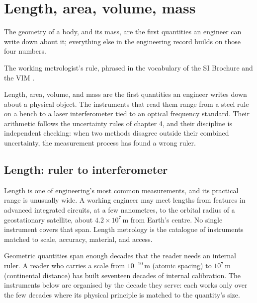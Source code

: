 \chapter{Length, area, volume, mass}
\label{vol01:ch07}

\epigraph{The geometry of a body, and its mass, are the first quantities
an engineer can write down about it; everything else in the engineering
record builds on those four numbers.}{The working metrologist's rule,
phrased in the vocabulary of the SI Brochure \cite{std:bipm-si2019} and
the VIM \cite{std:jcgm-vim}.}


\noindent
Length, area, volume, and mass are the first quantities an engineer
writes down about a physical object. The instruments that read them
range from a steel rule on a bench to a laser interferometer tied to
an optical frequency standard. Their arithmetic follows the
uncertainty rules of chapter 4, and their discipline is independent
checking: when two methods disagree outside their combined uncertainty,
the measurement process has found a wrong ruler.

\section{Length: ruler to interferometer}

Length is one of engineering's most common measurements, and its
practical range is unusually wide. A working engineer may meet lengths
from features in advanced integrated circuits, at a few nanometres, to
the orbital radius of a geostationary satellite, about $4.2 \times
10^{7} \,\si{\meter}$ from Earth's centre. No single instrument covers
that span. Length metrology is the catalogue of instruments matched to
scale, accuracy, material, and access.

\begin{archetype}
Geometric quantities span enough decades that the reader needs an
internal ruler. A reader who carries a scale from $10^{-10} \,\si
{\meter}$ (atomic spacing) to $10^{7} \,\si{\meter}$ (continental
distance) has built seventeen decades of internal calibration. The
instruments below are organised by the decade they serve: each works
only over the few decades where its physical principle is matched to
the quantity's size.
\end{archetype}

